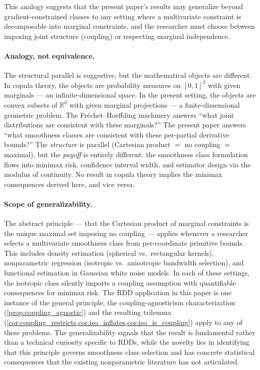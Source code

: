 This analogy suggests that the present paper's results may generalize beyond gradient-constrained classes to any setting where a multivariate constraint is decomposable into marginal constraints, and the researcher must choose between imposing joint structure (coupling) or respecting marginal independence.

\paragraph{Analogy, not equivalence.}
The structural parallel is suggestive, but the mathematical objects are different.
In copula theory, the objects are probability measures on $[0,1]^2$ with given marginals --- an infinite-dimensional space.
In the present setting, the objects are convex subsets of $\mathbb{R}^d$ with given marginal projections --- a finite-dimensional geometric problem.
The Fréchet--Hoeffding machinery answers ``what joint distributions are consistent with these marginals?''
The present paper answers ``what smoothness classes are consistent with these per-partial derivative bounds?''
The \emph{structure} is parallel (Cartesian product $=$ no coupling $=$ maximal), but the \emph{payoff} is entirely different: the smoothness class formulation flows into minimax risk, confidence interval width, and estimator design via the modulus of continuity.
No result in copula theory implies the minimax consequences derived here, and vice versa.

\paragraph{Scope of generalizability.}
The abstract principle --- that the Cartesian product of marginal constraints is the unique maximal set imposing no coupling --- applies whenever a researcher selects a multivariate smoothness class from per-coordinate primitive bounds.
This includes density estimation (spherical vs.\ rectangular kernels), nonparametric regression (isotropic vs.\ anisotropic bandwidth selection), and functional estimation in Gaussian white noise models.
In each of these settings, the isotropic class silently imports a coupling assumption with quantifiable consequences for minimax risk.
The RDD application in this paper is one instance of the general principle; the coupling-agnosticism characterization (\cref{prop:coupling_agnostic}) and the resulting trilemma (\cref{cor:coupling_restricts,cor:iso_inflates,cor:iso_is_coupling}) apply to any of these problems.
The generalizability signals that the result is fundamental rather than a technical curiosity specific to RDDs, while the novelty lies in identifying that this principle governs smoothness class selection and has concrete statistical consequences that the existing nonparametric literature has not articulated.

